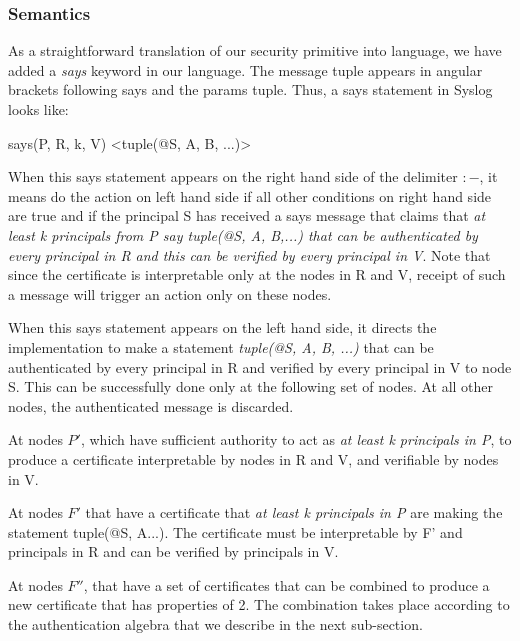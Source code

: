 \subsubsection{Semantics}
As a straightforward translation of our security primitive into language, we have added a {\em says} keyword in our language. The message tuple appears in angular brackets following says and the params tuple. Thus, a says statement in Syslog looks like:
\begin{center}
says(P, R, k, V) <tuple(@S, A, B, ...)> 
\end{center}
When this says statement appears on the right hand side of the delimiter $:-$, it means do the action on left hand side if all other conditions on right hand side are true and if the principal S has received a says message that claims that {\em at least k principals from P say tuple(@S, A, B,...) that can be authenticated by every principal in R and this can be verified by every principal in V}. Note that since the certificate is interpretable only at the nodes in R and V, receipt of such a message will trigger an action only on these nodes. 

When this says statement appears on the left hand side, it directs the implementation to make a statement {\em tuple(@S, A, B, ...)} that can be authenticated by every principal in R and verified by every principal in V to node S. This can be successfully done only at the following set of nodes. At all other nodes, the authenticated message is discarded.

\be
\item At nodes $P'$, which have sufficient authority to act as {\em at least k principals in P}, to produce a certificate interpretable by nodes in R and V, and verifiable by nodes in V. 
\item At nodes $F'$ that have a certificate that {\em at least k principals in P} are making the statement tuple(@S, A...). The certificate must be interpretable by F' and principals in R and can be verified by principals in V.
\item At nodes $F''$, that have a set of certificates that can be combined to produce a new certificate that has properties of 2. The combination takes place according to the authentication algebra that we describe in the next sub-section. 
\ee

